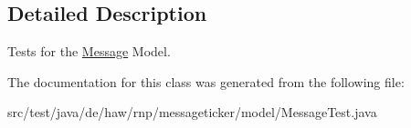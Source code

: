 \subsection{Detailed Description}
Tests for the \hyperlink{classde_1_1haw_1_1rnp_1_1messageticker_1_1model_1_1Message}{Message} Model. 

The documentation for this class was generated from the following file\-:\begin{DoxyCompactItemize}
\item 
src/test/java/de/haw/rnp/messageticker/model/Message\-Test.\-java\end{DoxyCompactItemize}
